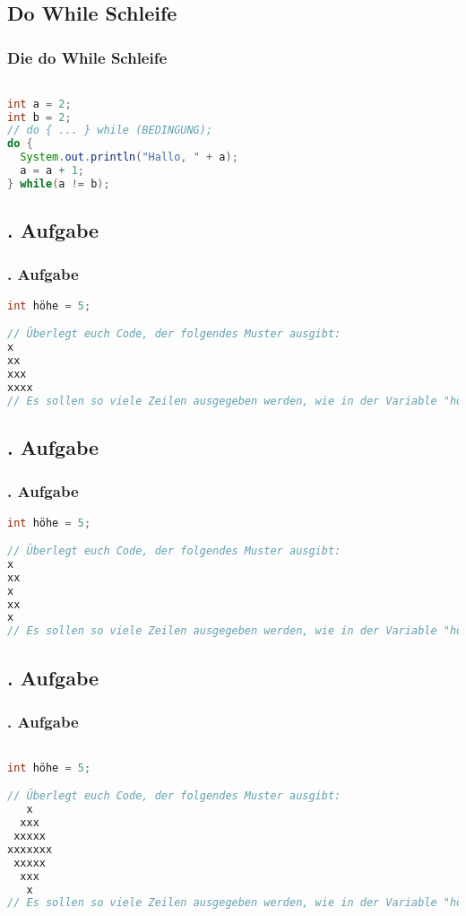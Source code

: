 \documentclass{beamer}
\begin{document}
\begin{frame}[fragile]
\subsection{Do While Schleife}
\frametitle{Die do While Schleife} 
\begin{lstlisting}[language=java]

int a = 2;
int b = 2;
// do { ... } while (BEDINGUNG);
do {
  System.out.println("Hallo, " + a);
  a = a + 1;	
} while(a != b);

	\end{lstlisting}
\end{frame}
\begin{frame}[fragile]
\subsection{. Aufgabe}
\frametitle{. Aufgabe}
	
\begin{lstlisting}[language=java]
int höhe = 5;

// Überlegt euch Code, der folgendes Muster ausgibt:
x
xx
xxx
xxxx
// Es sollen so viele Zeilen ausgegeben werden, wie in der Variable "höhe" steht.

	\end{lstlisting}
\end{frame}
\begin{frame}[fragile]
\subsection{. Aufgabe}
\frametitle{. Aufgabe}

\begin{lstlisting}[language=java]
int höhe = 5;

// Überlegt euch Code, der folgendes Muster ausgibt:
x
xx
x
xx
x
// Es sollen so viele Zeilen ausgegeben werden, wie in der Variable "höhe" steht.
	\end{lstlisting}
\end{frame}
\begin{frame}[fragile]
\subsection{. Aufgabe}
\frametitle{. Aufgabe}
	
\begin{lstlisting}[language=java]

int höhe = 5;

// Überlegt euch Code, der folgendes Muster ausgibt:
   x  
  xxx
 xxxxx
xxxxxxx
 xxxxx
  xxx
   x
// Es sollen so viele Zeilen ausgegeben werden, wie in der Variable "höhe" steht.


	\end{lstlisting}
\end{frame}
\end{document}
